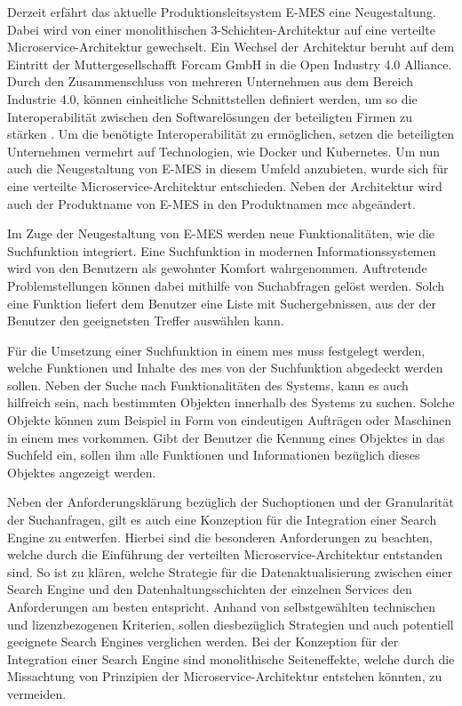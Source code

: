 Derzeit erfährt das aktuelle Produktionsleitsystem E-MES eine Neugestaltung. Dabei wird von einer monolithischen 3-Schichten-Architektur auf eine verteilte Microservice-Architektur gewechselt. Ein Wechsel der Architektur beruht auf dem Eintritt der Muttergesellschafft Forcam GmbH in die \glqq Open Industry 4.0 Alliance\grqq{}. Durch den Zusammenschluss von mehreren Unternehmen aus dem Bereich \glqq Industrie 4.0\grqq{}, können einheitliche Schnittstellen definiert werden, um so die Interoperabilität zwischen den Softwarelösungen der beteiligten Firmen zu stärken \cite{OpenIndustry4.0Alliance.2021}. Um die benötigte Interoperabilität zu ermöglichen, setzen die beteiligten Unternehmen vermehrt auf Technologien, wie Docker und Kubernetes. Um nun auch die Neugestaltung von E-MES in diesem Umfeld anzubieten, wurde sich für eine verteilte Microservice-Architektur entschieden. Neben der Architektur wird auch der Produktname von \glqq E-MES\grqq{} in den Produktnamen \glqq \gls{mcc}\grqq{} abgeändert. 

Im Zuge der Neugestaltung von E-MES werden neue Funktionalitäten, wie die Suchfunktion integriert. Eine Suchfunktion in modernen Informationssystemen wird von den Benutzern als gewohnter Komfort wahrgenommen. Auftretende Problemstellungen können dabei mithilfe von Suchabfragen gelöst werden. Solch eine Funktion liefert dem Benutzer eine Liste mit Suchergebnissen, aus der der Benutzer den geeignetsten Treffer auswählen kann.

Für die Umsetzung einer Suchfunktion in einem \gls{mes} muss festgelegt werden, welche Funktionen und Inhalte des \gls{mes} von der Suchfunktion abgedeckt werden sollen. Neben der Suche nach Funktionalitäten des Systems, kann es auch hilfreich sein, nach bestimmten \glqq Objekten\grqq{} innerhalb des Systems zu suchen. Solche Objekte können zum Beispiel in Form von eindeutigen Aufträgen oder Maschinen in einem \gls{mes} vorkommen. Gibt der Benutzer die Kennung eines Objektes in das Suchfeld ein, sollen ihm alle Funktionen und Informationen bezüglich dieses Objektes angezeigt werden.

Neben der Anforderungsklärung bezüglich der Suchoptionen und der Granularität der Suchanfragen, gilt es auch eine Konzeption für die Integration einer Search Engine zu entwerfen. Hierbei sind die besonderen Anforderungen zu beachten, welche durch die Einführung der verteilten Microservice-Architektur entstanden sind. So ist zu klären, welche Strategie für die Datenaktualisierung zwischen einer Search Engine und den Datenhaltungsschichten der einzelnen Services den Anforderungen am besten entspricht. Anhand von selbstgewählten technischen und lizenzbezogenen Kriterien, sollen diesbezüglich Strategien und auch potentiell geeignete Search Engines verglichen werden. Bei der Konzeption für der Integration einer Search Engine sind monolithische Seiteneffekte, welche durch die Missachtung von Prinzipien der Microservice-Architektur entstehen könnten, zu vermeiden.

